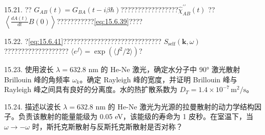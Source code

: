 15.21. ?? \(G_{AB}(t) = G_{BA}(t - i\beta\hbar)\)?????????????????\(\hat{\chi}_{AB}^{\prime\prime}(t)\) ?? \(\left\langle\frac{dA(t)}{dt}B(0)\right\rangle\)???????????\autoref{eq:15.6.39}????

15.22. ?\autoref{eq:15.6.41}????????????????????????????? \(S_{\mathrm{self}}(\boldsymbol{k},\omega)\) ??????????????????? \(\langle e^{f}\rangle = \exp\left(\langle f^{2}/2\rangle\right)\)?

15.23. 使用波长 \(\lambda = 632.8\) nm 的 He-Ne 激光，确定水分子中 90° 激光散射 Brillouin 峰的角频率 \(\omega_{k}\)。确定 Rayleigh 峰的宽度，并证明 Brillouin 峰与 Rayleigh 峰之间具有良好的分离度。水的热扩散系数为 \(D_{T} = 1.4 \times 10^{-7}\,\mathrm{m}^{2}/\mathrm{s}\)。

15.24. 描述以波长 \(\lambda = 632.8\) nm 的 He-Ne 激光为光源的拉曼散射的动力学结构因子。负责该散射的能量能级为 0.05 eV，该能级的寿命为 1 皮秒。在室温下，当 \(\omega \to -\omega\) 时，斯托克斯散射与反斯托克斯散射是否对称？


